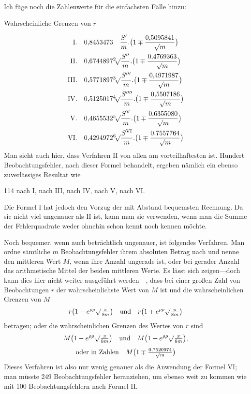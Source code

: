 Ich füge noch die Zahlenwerte für die einfachsten Fälle hinzu:
\begin{center}Wahrscheinliche Grenzen von \(r\)\end{center}
\[
\begin{array}{r@{\quad}l}
\mathrm{I}.&0{,}8453473\quad\dfrac{S'}m.\bigl(1\mp\dfrac{0{,}5095841}{\surd m}\bigr)\\[10pt]
\mathrm{II}.&0{,}6744897\BareRoot[2]{\dfrac{S''}m}.\bigl(1\mp\dfrac{0{,}4769363}{\surd m}\bigr)\\[10pt]
\mathrm{III}.&0{,}5771897\BareRoot[3]{\dfrac{S'''}m}.\bigl(1\mp\dfrac{0{,}4971987}{\surd m}\bigr)\\[10pt]
\mathrm{IV}.&0{,}5125017\BareRoot[4]{\dfrac{S''''}m}.\bigl(1\mp\dfrac{0{,}5507186}{\surd m}\bigr)\\[10pt]
\mathrm{V}.&0{,}4655532\BareRoot[5]{\dfrac{S^{\mathrm V}}m}.\bigl(1\mp\dfrac{0{,}6355080}{\surd m}\bigr)\\[10pt]
\mathrm{VI}.&0{,}4294972\BareRoot[6]{\dfrac{S^{\mathrm{VI}}}m}.\bigl(1\mp\dfrac{0{,}7557764}{\surd m}\bigr)
\end{array}
\]
Man sieht auch hier, dass Verfahren II von allen am vorteilhaftesten ist. Hundert Beobachtungsfehler, nach dieser Formel behandelt, ergeben nämlich ein ebenso zuverlässiges Resultat wie
\begin{center}
114 nach I, nach III, nach IV, nach V, nach VI.
\end{center}
Die Formel I hat jedoch den Vorzug der mit Abstand bequemsten Rechnung. Da sie nicht viel ungenauer als II ist, kann man sie verwenden, wenn man die Summe der Fehlerquadrate weder ohnehin schon kennt noch kennen möchte.

Noch bequemer, wenn auch beträchtlich ungenauer, ist folgendes Verfahren. Man ordne sämtliche \(m\) Beobachtungsfehler ihrem absoluten Betrag nach und nenne den mittleren Wert \(M\), wenn ihre Anzahl ungerade ist, oder bei gerader Anzahl das arithmetische Mittel der beiden mittleren Werte. Es lässt sich zeigen—doch kann dies hier nicht weiter ausgeführt werden—, dass bei einer großen Zahl von Beobachtungen \(r\) der wahrscheinlichste Wert von \(M\) ist und die wahrscheinlichen Grenzen von \(M\)
\[
r\bigl(1-e^{\rho\rho}\surd\tfrac\pi{8m}\bigr)\quad\text{und}\quad r\bigl(1+e^{\rho\rho}\surd\tfrac\pi{8m}\bigr)
\]
betragen; oder die wahrscheinlichen Grenzen des Wertes von \(r\) sind
\[
\begin{gathered}
M\bigl(1-e^{\rho\rho}\surd\tfrac\pi{8m}\bigr)\quad\text{und}\quad M\bigl(1+e^{\rho\rho}\surd\tfrac\pi{8m}\bigr),\\[4pt]
\text{oder in Zahlen}\quad M\bigl(1\mp\tfrac{0{,}7520974}{\surd m}\bigr)
\end{gathered}
\]
Dieses Verfahren ist also nur wenig genauer als die Anwendung der Formel VI; man müsste 249 Beobachtungsfehler heranziehen, um ebenso weit zu kommen wie mit 100 Beobachtungsfehlern nach Formel II.

